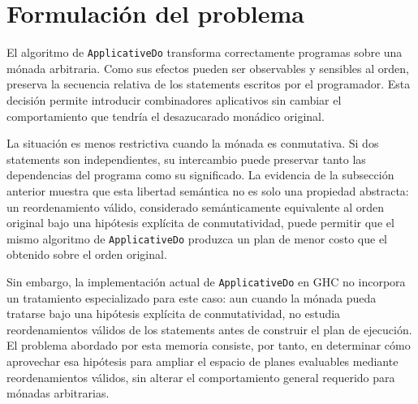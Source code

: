 
\section{Formulación del problema}
\label{sec:problema-formulacion}

El algoritmo de \texttt{ApplicativeDo} transforma correctamente programas sobre una mónada arbitraria. Como sus efectos pueden ser observables y sensibles al orden, preserva la secuencia relativa de los statements escritos por el programador. Esta decisión permite introducir combinadores aplicativos sin cambiar el comportamiento que tendría el desazucarado monádico original.

La situación es menos restrictiva cuando la mónada es conmutativa. Si dos statements son independientes, su intercambio puede preservar tanto las dependencias del programa como su significado. La evidencia de la subsección anterior muestra que esta libertad semántica no es solo una propiedad abstracta: un reordenamiento válido, considerado semánticamente equivalente al orden original bajo una hipótesis explícita de conmutatividad, puede permitir que el mismo algoritmo de \texttt{ApplicativeDo} produzca un plan de menor costo que el obtenido sobre el orden original.

Sin embargo, la implementación actual de \texttt{ApplicativeDo} en \textsf{GHC} no incorpora un tratamiento especializado para este caso: aun cuando la mónada pueda tratarse bajo una hipótesis explícita de conmutatividad, no estudia reordenamientos válidos de los statements antes de construir el plan de ejecución. El problema abordado por esta memoria consiste, por tanto, en determinar cómo aprovechar esa hipótesis para ampliar el espacio de planes evaluables mediante reordenamientos válidos, sin alterar el comportamiento general requerido para mónadas arbitrarias.
